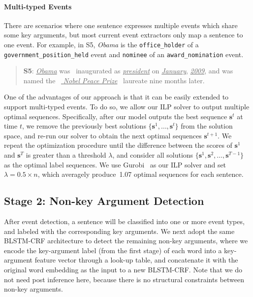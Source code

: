 \paragraph{Multi-typed Events}
There are scenarios where one sentence expresses multiple events which share some key arguments,
but most current event extractors only map a sentence to one event.
For example, in S5, \emph{Obama} is the \texttt{office\_holder} of a \texttt{government\_position\_held} event and \texttt{nominee} of an \texttt{award\_nomination} event.
\begin{quote}
	\textbf{S5}: \underline{\emph{Obama}} was  inaugurated as \underline{\emph{president}} on \underline{\emph{January}}, \underline{\emph{2009}}, and was named the  \underline{\emph{ Nobel  Peace  Prize}}  laureate nine months later.
\end{quote}
One of the advantages of our approach is that it can be easily extended to support multi-typed events.
To do so, we allow our ILP solver to output multiple optimal sequences. Specifically, after our model outputs the best sequence $\bm{s}^t$
at time $t$, we remove the previously best solutions
 $\{\bm{s}^1, \ldots, \bm{s}^{t}\}$ from the solution space, and re-run our solver to obtain the next optimal sequences $\bm{s}^{t+1}$.
We repeat the optimization procedure until the difference between the scores of $\bm{s}^1$ and $\bm{s}^T$ is greater
than a threshold $\lambda$, and consider all solutions $\{\bm{s}^1, \bm{s}^2, \ldots, \bm{s}^{T-1}\}$ as the optimal label sequences.
We use Gurobi~\cite{gurobi} as our ILP solver and set $\lambda=0.5 \times n$, which averagely produce~1.07 optimal sequences for each sentence.

\subsection{Stage 2: Non-key Argument Detection}
After event detection, a sentence will be classified into one or more event types, and labeled with the corresponding key arguments.
%
We next adopt the same BLSTM-CRF architecture %
to detect the remaining non-key arguments, where we encode the key-argument label (from the first stage) %
of each word into a key-argument feature vector through a look-up table, and concatenate it with the original word
embedding as the input to a new BLSTM-CRF. Note that we do not need post inference here, because there is no structural constraints between non-key arguments.
